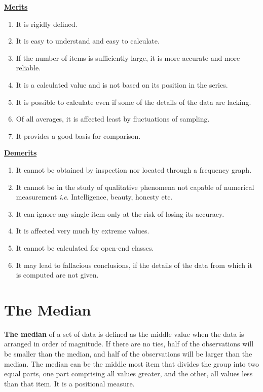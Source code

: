 \documentclass[
]{book}
\begin{document}
\ul{\textbf{Merits}}

\begin{enumerate}
\def\labelenumi{\arabic{enumi}.}
\item
  It is rigidly defined.
\item
  It is easy to understand and easy to calculate.
\item
  If the number of items is sufficiently large, it is more accurate
  and more reliable.
\item
  It is a calculated value and is not based on its position in the
  series.
\item
  It is possible to calculate even if some of the details of the data
  are lacking.
\item
  Of all averages, it is affected least by fluctuations of sampling.
\item
  It provides a good basis for comparison.
\end{enumerate}

\ul{\textbf{Demerits}}

\begin{enumerate}
\def\labelenumi{\arabic{enumi}.}
\item
  It cannot be obtained by inspection nor located through a frequency
  graph.
\item
  It cannot be in the study of qualitative phenomena not capable of
  numerical measurement \emph{i}.\emph{e}. Intelligence, beauty, honesty etc.
\item
  It can ignore any single item only at the risk of losing its
  accuracy.
\item
  It is affected very much by extreme values.
\item
  It cannot be calculated for open-end classes.
\item
  It may lead to fallacious conclusions, if the details of the data
  from which it is computed are not given.
\end{enumerate}

\hypertarget{the-median}{%
\section{The Median}\label{the-median}}

\textbf{The median} of a set of data is defined as the middle value when the
data is arranged in order of magnitude. If there are no ties, half of
the observations will be smaller than the median, and half of the
observations will be larger than the median. The median can be the
middle most item that divides the group into two equal parts, one part
comprising all values greater, and the other, all values less than that
item. It is a positional measure.
\end{document}

